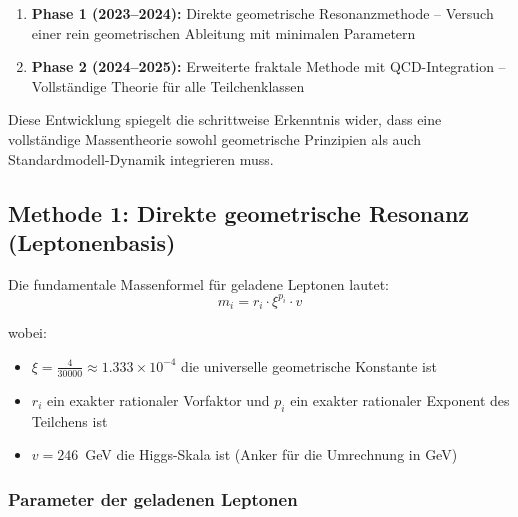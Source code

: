 	\begin{enumerate}
		\item \textbf{Phase 1 (2023--2024):} Direkte geometrische Resonanzmethode -- Versuch einer rein geometrischen Ableitung mit minimalen Parametern
		\item \textbf{Phase 2 (2024--2025):} Erweiterte fraktale Methode mit QCD-Integration -- Vollständige Theorie für alle Teilchenklassen
	\end{enumerate}
	
	Diese Entwicklung spiegelt die schrittweise Erkenntnis wider, dass eine vollständige Massentheorie sowohl geometrische Prinzipien als auch Standardmodell-Dynamik integrieren muss.
	
	\subsection{Methode 1: Direkte geometrische Resonanz (Leptonenbasis)}
	
	Die fundamentale Massenformel für geladene Leptonen lautet:
	\begin{equation}
		\boxed{m_i = r_i \cdot \xi^{p_i} \cdot v}
		\label{eq:t0_direct_mass}
	\end{equation}
	
	wobei:
	\begin{itemize}
		\item $\xi = \frac{4}{30000} \approx 1.333 \times 10^{-4}$ die universelle geometrische Konstante ist
		\item $r_i$ ein exakter rationaler Vorfaktor und $p_i$ ein exakter rationaler Exponent des Teilchens ist
		\item $v = 246$~GeV die Higgs-Skala ist (Anker für die Umrechnung in GeV)
	\end{itemize}
	
	\subsubsection{Parameter der geladenen Leptonen}
	
	\begin{table}[h]
		\centering
		\caption{Parameter $r$, $p$ der geladenen Leptonen (aus \texttt{calc\_De.py})}
		\label{tab:lepton_qn_direkt}
	\end{table}
	
